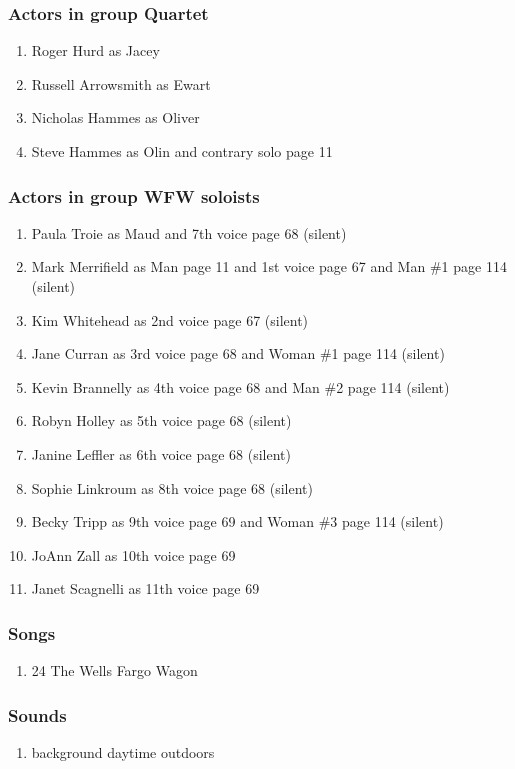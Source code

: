 \subsubsection{Actors in group Quartet}
\begin{enumerate}
\item Roger Hurd as Jacey
\item Russell Arrowsmith as Ewart
\item Nicholas Hammes as Oliver
\item Steve Hammes as Olin and contrary solo page 11
\end{enumerate}
\subsubsection{Actors in group WFW soloists}
\begin{enumerate}
\item Paula Troie as Maud and 7th voice page 68 (silent)
\item Mark Merrifield as Man page 11 and 1st voice page 67 and Man \#1 page 114 (silent)
\item Kim Whitehead as 2nd voice page 67 (silent)
\item Jane Curran as 3rd voice page 68 and Woman \#1 page 114 (silent)
\item Kevin Brannelly as 4th voice page 68 and Man \#2 page 114 (silent)
\item Robyn Holley as 5th voice page 68 (silent)
\item Janine Leffler as 6th voice page 68 (silent)
\item Sophie Linkroum as 8th voice page 68 (silent)
\item Becky Tripp as 9th voice page 69 and Woman \#3 page 114 (silent)
\item JoAnn Zall as 10th voice page 69
\item Janet Scagnelli as 11th voice page 69
\end{enumerate}

\subsubsection{Songs}
\begin{enumerate}
\item 24 The Wells Fargo Wagon
\end{enumerate}\subsubsection{Sounds}
\begin{enumerate}
\item background daytime outdoors
\end{enumerate}
